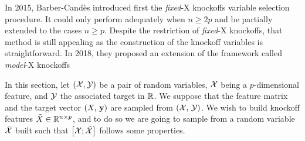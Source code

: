 In 2015, Barber-Candès introduced first the \textit{fixed}-X knockoffs variable selection procedure.
It could only perform adequately when $n \geq 2p$ and be partially extended to the cases $n \geq p$.
Despite the restriction of \textit{fixed}-X knockoffs, that method is still appealing as the construction of the
knockoff variables is straightforward.
In 2018, they proposed an extension of the framework called \textit{model}-X knockoffs

In this section, let $(\mathcal{X}, \mathcal{Y})$ be a pair of random variables,
$\mathcal{X}$ being a $p$-dimensional feature,
and $\mathcal{Y}$ the associated target in $\mathbb{R}$.
We suppose that the feature matrix and the target vector $(X,\, \mathbf{y})$ are sampled from $(\mathcal{X},\, \mathcal{Y})$.
We wish to build knockoff features $\tilde{X} \in \mathbb{R}^{n \times p}$, and to do so we are going to sample from a
random variable $\tilde{\mathcal{X}}$ built such that $\big[ \mathcal{X}; \tilde{\mathcal{X}} \big]$ follows some properties.

